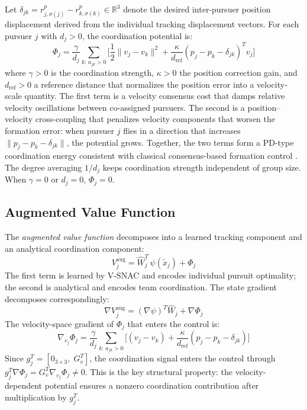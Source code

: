 \documentclass[conference]{IEEEtran}
\begin{document}
Let $\delta_{jk} = r_{j,\sigma(j)}^p - r_{k,\sigma(k)}^p \in \mathbb{R}^3$ denote the desired inter-pursuer position displacement derived from the individual tracking displacement vectors. For each pursuer $j$ with $d_j > 0$, the coordination potential is:
\begin{equation}\label{eq:phi}
\Phi_j = \frac{\gamma}{d_j}\!\sum_{k:\,a_{jk}>0}\!\bigg[\frac{1}{2}\|v_j{-}v_k\|^2 + \frac{\kappa}{d_{\mathrm{ref}}}(p_j{-}p_k{-}\delta_{jk})^T v_j\bigg]
\end{equation}
where $\gamma > 0$ is the coordination strength, $\kappa > 0$ the position correction gain, and $d_{\mathrm{ref}} > 0$ a reference distance that normalizes the position error into a velocity-scale quantity. The first term is a velocity consensus cost that damps relative velocity oscillations between co-assigned pursuers. The second is a position--velocity cross-coupling that penalizes velocity components that worsen the formation error: when pursuer $j$ flies in a direction that increases $\|p_j - p_k - \delta_{jk}\|$, the potential grows. Together, the two terms form a PD-type coordination energy consistent with classical consensus-based formation control \cite{b_ren2005,b_olfati2004}. The degree averaging $1/d_j$ keeps coordination strength independent of group size. When $\gamma = 0$ or $d_j = 0$, $\Phi_j = 0$.

\subsection{Augmented Value Function}

The \emph{augmented value function} decomposes into a learned tracking component and an analytical coordination component:
\begin{equation}\label{eq:vaug}
V_j^{\mathrm{aug}} = \hat{W}_j^T\,\psi(\tilde{x}_j) + \Phi_j
\end{equation}
The first term is learned by V-SNAC and encodes individual pursuit optimality; the second is analytical and encodes team coordination. The state gradient decomposes correspondingly:
\begin{equation}\label{eq:grad_aug}
\nabla V_j^{\mathrm{aug}} = (\nabla \psi)^T \hat{W}_j + \nabla \Phi_j
\end{equation}
The velocity-space gradient of $\Phi_j$ that enters the control is:
\begin{equation}\label{eq:grad_phi}
\nabla_{v_j}\!\Phi_j = \frac{\gamma}{d_j}\!\sum_{k:\,a_{jk}>0}\!\bigg[(v_j{-}v_k) + \frac{\kappa}{d_{\mathrm{ref}}}(p_j{-}p_k{-}\delta_{jk})\bigg]
\end{equation}
Since $g_j^T = [0_{3\times 3},\; G_v^T]$, the coordination signal enters the control through $g_j^T\nabla\Phi_j = G_v^T\nabla_{v_j}\Phi_j \neq 0$. This is the key structural property: the velocity-dependent potential ensures a nonzero coordination contribution after multiplication by $g_j^T$.
\end{document}
